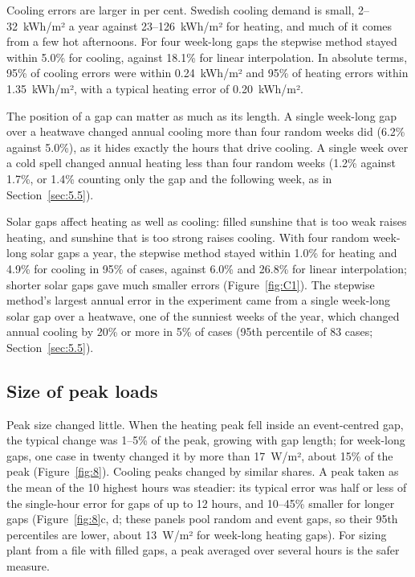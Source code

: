 Cooling errors are larger in per cent. Swedish cooling demand is small, 2--32~kWh/m² a year against 23--126~kWh/m² for heating, and much of it comes from a few hot afternoons. For four week-long gaps the stepwise method stayed within 5.0\% for cooling, against 18.1\% for linear interpolation. In absolute terms, 95\% of cooling errors were within 0.24~kWh/m² and 95\% of heating errors within 1.35~kWh/m², with a typical heating error of 0.20~kWh/m².

The position of a gap can matter as much as its length. A single week-long gap over a heatwave changed annual cooling more than four random weeks did (6.2\% against 5.0\%), as it hides exactly the hours that drive cooling. A single week over a cold spell changed annual heating less than four random weeks (1.2\% against 1.7\%, or 1.4\% counting only the gap and the following week, as in Section~\ref{sec:5.5}).

Solar gaps affect heating as well as cooling: filled sunshine that is too weak raises heating, and sunshine that is too strong raises cooling. With four random week-long solar gaps a year, the stepwise method stayed within 1.0\% for heating and 4.9\% for cooling in 95\% of cases, against 6.0\% and 26.8\% for linear interpolation; shorter solar gaps gave much smaller errors (Figure~\ref{fig:C1}). The stepwise method's largest annual error in the experiment came from a single week-long solar gap over a heatwave, one of the sunniest weeks of the year, which changed annual cooling by 20\% or more in 5\% of cases (95th percentile of 83 cases; Section~\ref{sec:5.5}).

\subsection{Size of peak loads}\label{sec:5.2}

Peak size changed little. When the heating peak fell inside an event-centred gap, the typical change was 1--5\% of the peak, growing with gap length; for week-long gaps, one case in twenty changed it by more than 17~W/m², about 15\% of the peak (Figure~\ref{fig:8}). Cooling peaks changed by similar shares. A peak taken as the mean of the 10 highest hours was steadier: its typical error was half or less of the single-hour error for gaps of up to 12 hours, and 10--45\% smaller for longer gaps (Figure~\ref{fig:8}c, d; these panels pool random and event gaps, so their 95th percentiles are lower, about 13~W/m² for week-long heating gaps). For sizing plant from a file with filled gaps, a peak averaged over several hours is the safer measure.

